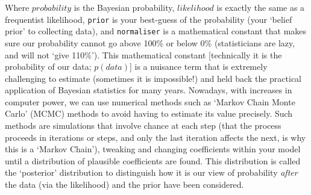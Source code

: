 \documentclass[11pt]{article}
\begin{document}
{Where $probability$ is the Bayesian probability, $likelihood$ is exactly the same as a frequentist likelihood, \texttt{prior} is your best-guess of the probability (your `belief prior' to collecting data), and \texttt{normaliser} is a mathematical constant that makes sure our probability cannot go above 100\% or below 0\% (statisticians are lazy, and will not `give 110\%'). This mathematical constant [technically it is the probability of our data; $p(data)$] is a nuisance term that is extremely challenging to estimate (sometimes it is impossible!) and held back the practical application of Bayesian statistics for many years. Nowadays, with increases in computer power, we can use numerical methods such as `Markov Chain Monte Carlo' (MCMC) methods to avoid having to estimate its value precisely. Such methods are simulations  that involve chance at each step (that the process proceeds in iterations or steps, and only the last iteration affects the next, is why this is a `Markov Chain'), tweaking and changing coefficients within your model until a distribution of plausible coefficients are found. This distribution is called the `posterior' distribution to distinguish how it is our view of probability \emph{after} the data (via the likelihood) and the prior have been considered. %



}
\end{document}
